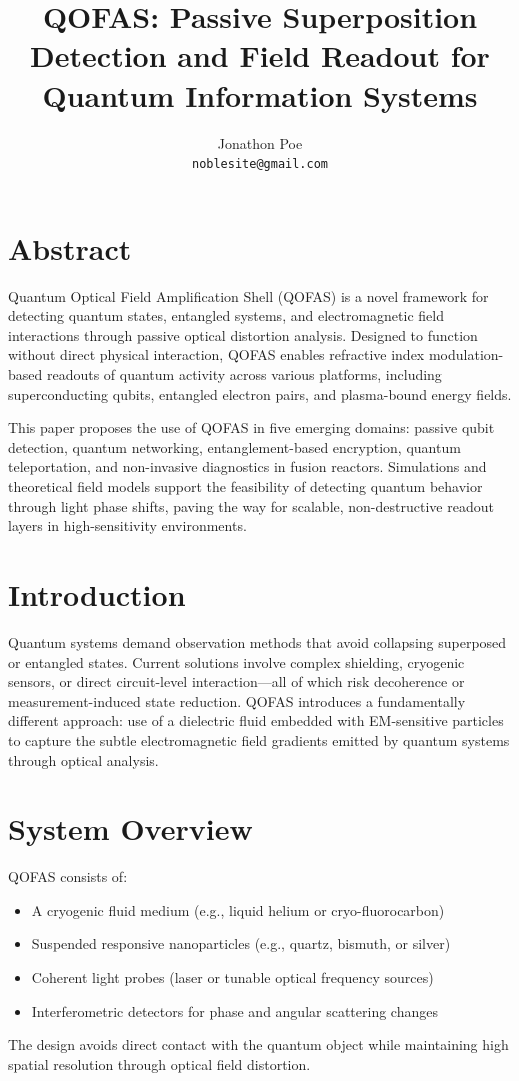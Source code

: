 \documentclass[11pt]{article}
\title{QOFAS: Passive Superposition Detection and Field Readout for Quantum Information Systems}
\author{Jonathon Poe \\ \texttt{noblesite@gmail.com}}
\date{}
\begin{document}
\maketitle

\section*{Abstract}
Quantum Optical Field Amplification Shell (QOFAS) is a novel framework for detecting quantum states, entangled systems, and electromagnetic field interactions through passive optical distortion analysis. Designed to function without direct physical interaction, QOFAS enables refractive index modulation-based readouts of quantum activity across various platforms, including superconducting qubits, entangled electron pairs, and plasma-bound energy fields.

This paper proposes the use of QOFAS in five emerging domains: passive qubit detection, quantum networking, entanglement-based encryption, quantum teleportation, and non-invasive diagnostics in fusion reactors. Simulations and theoretical field models support the feasibility of detecting quantum behavior through light phase shifts, paving the way for scalable, non-destructive readout layers in high-sensitivity environments.

\section{Introduction}
Quantum systems demand observation methods that avoid collapsing superposed or entangled states. Current solutions involve complex shielding, cryogenic sensors, or direct circuit-level interaction---all of which risk decoherence or measurement-induced state reduction. QOFAS introduces a fundamentally different approach: use of a dielectric fluid embedded with EM-sensitive particles to capture the subtle electromagnetic field gradients emitted by quantum systems through optical analysis.

\section{System Overview}
QOFAS consists of:
\begin{itemize}
  \item A cryogenic fluid medium (e.g., liquid helium or cryo-fluorocarbon)
  \item Suspended responsive nanoparticles (e.g., quartz, bismuth, or silver)
  \item Coherent light probes (laser or tunable optical frequency sources)
  \item Interferometric detectors for phase and angular scattering changes
\end{itemize}
The design avoids direct contact with the quantum object while maintaining high spatial resolution through optical field distortion.
\end{document}
